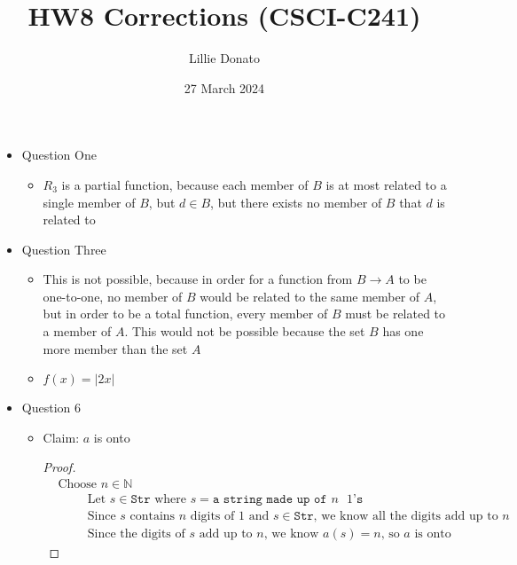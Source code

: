 \documentclass{article}
\title{HW8 Corrections (CSCI-C241)}
\author{Lillie Donato}
\date{27 March 2024}
\begin{document}
\maketitle

\begin{itemize}
    \item Question One
    \begin{itemize}
        \item $R_3$ is a partial function, because each member of $B$ is at most related to a single member of $B$, but $d \in B$, but there exists no member of $B$ that $d$ is related to
    \end{itemize}
    \item Question Three
    \begin{itemize}
        \item This is not possible, because in order for a function from $B \rightarrow A$ to be one-to-one, no member of $B$ would be related to the same member of $A$, but in order to be a total function, every member of $B$ must be related to a member of $A$. This would not be possible because the set $B$ has one more member than the set $A$
        \item $f(x) = |2x|$
    \end{itemize}
    \item Question 6
    \begin{itemize}
        \item Claim: $a$ is onto
        \begin{proof}
            \begin{align}
                &\text{Choose } n \in \mathbb{N} \\
                &\hspace{1cm} \text{Let } s \in \texttt{Str} \text{ where } s = \texttt{a string made up of $n$ $1$'s} \\
                &\hspace{1cm} \text{Since $s$ contains $n$ digits of $1$ and $s \in \texttt{Str}$, we know all the digits add up to $n$}  \\
                &\hspace{1cm} \text{Since the digits of $s$ add up to $n$, we know $a(s)=n$, so $a$ is onto}
            \end{align}
        \end{proof}
    \end{itemize}
\end{itemize}
\end{document}
